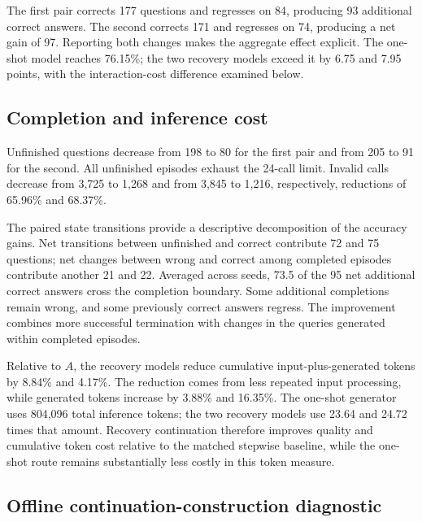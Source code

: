The first pair corrects 177 questions and regresses on 84, producing 93 additional correct answers. The second corrects 171 and regresses on 74, producing a net gain of 97. Reporting both changes makes the aggregate effect explicit. The one-shot model reaches 76.15\%; the two recovery models exceed it by 6.75 and 7.95 points, with the interaction-cost difference examined below.

\subsection{Completion and inference cost}

\begin{table}[htbp]
 \centering\small
 \caption{Execution and cumulative inference cost on the held-out set. Tokens count repeated full histories across turns.}
 \label{tab:cost-en}
 \RecoveryCostTableEN
\end{table}

Unfinished questions decrease from 198 to 80 for the first pair and from 205 to 91 for the second. All unfinished episodes exhaust the 24-call limit. Invalid calls decrease from 3,725 to 1,268 and from 3,845 to 1,216, respectively, reductions of 65.96\% and 68.37\%.

The paired state transitions provide a descriptive decomposition of the accuracy gains. Net transitions between unfinished and correct contribute 72 and 75 questions; net changes between wrong and correct among completed episodes contribute another 21 and 22. Averaged across seeds, 73.5 of the 95 net additional correct answers cross the completion boundary. Some additional completions remain wrong, and some previously correct answers regress. The improvement combines more successful termination with changes in the queries generated within completed episodes.

Relative to $A$, the recovery models reduce cumulative input-plus-generated tokens by 8.84\% and 4.17\%. The reduction comes from less repeated input processing, while generated tokens increase by 3.88\% and 16.35\%. The one-shot generator uses 804,096 total inference tokens; the two recovery models use 23.64 and 24.72 times that amount. Recovery continuation therefore improves quality and cumulative token cost relative to the matched stepwise baseline, while the one-shot route remains substantially less costly in this token measure.

\subsection{Offline continuation-construction diagnostic}

